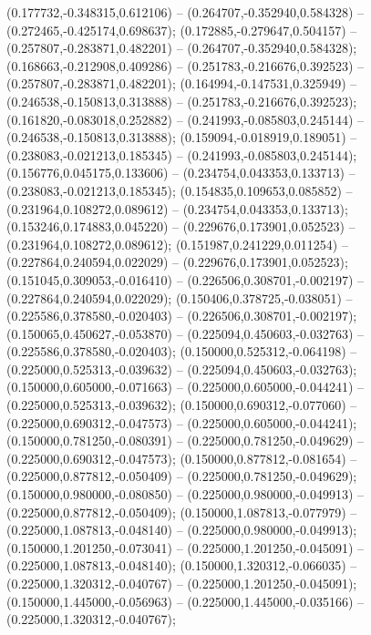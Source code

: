  (0.177732,-0.348315,0.612106) -- (0.264707,-0.352940,0.584328) -- (0.272465,-0.425174,0.698637);
 (0.172885,-0.279647,0.504157) -- (0.257807,-0.283871,0.482201) -- (0.264707,-0.352940,0.584328);
 (0.168663,-0.212908,0.409286) -- (0.251783,-0.216676,0.392523) -- (0.257807,-0.283871,0.482201);
 (0.164994,-0.147531,0.325949) -- (0.246538,-0.150813,0.313888) -- (0.251783,-0.216676,0.392523);
 (0.161820,-0.083018,0.252882) -- (0.241993,-0.085803,0.245144) -- (0.246538,-0.150813,0.313888);
 (0.159094,-0.018919,0.189051) -- (0.238083,-0.021213,0.185345) -- (0.241993,-0.085803,0.245144);
 (0.156776,0.045175,0.133606) -- (0.234754,0.043353,0.133713) -- (0.238083,-0.021213,0.185345);
 (0.154835,0.109653,0.085852) -- (0.231964,0.108272,0.089612) -- (0.234754,0.043353,0.133713);
 (0.153246,0.174883,0.045220) -- (0.229676,0.173901,0.052523) -- (0.231964,0.108272,0.089612);
 (0.151987,0.241229,0.011254) -- (0.227864,0.240594,0.022029) -- (0.229676,0.173901,0.052523);
 (0.151045,0.309053,-0.016410) -- (0.226506,0.308701,-0.002197) -- (0.227864,0.240594,0.022029);
 (0.150406,0.378725,-0.038051) -- (0.225586,0.378580,-0.020403) -- (0.226506,0.308701,-0.002197);
 (0.150065,0.450627,-0.053870) -- (0.225094,0.450603,-0.032763) -- (0.225586,0.378580,-0.020403);
 (0.150000,0.525312,-0.064198) -- (0.225000,0.525313,-0.039632) -- (0.225094,0.450603,-0.032763);
 (0.150000,0.605000,-0.071663) -- (0.225000,0.605000,-0.044241) -- (0.225000,0.525313,-0.039632);
 (0.150000,0.690312,-0.077060) -- (0.225000,0.690312,-0.047573) -- (0.225000,0.605000,-0.044241);
 (0.150000,0.781250,-0.080391) -- (0.225000,0.781250,-0.049629) -- (0.225000,0.690312,-0.047573);
 (0.150000,0.877812,-0.081654) -- (0.225000,0.877812,-0.050409) -- (0.225000,0.781250,-0.049629);
 (0.150000,0.980000,-0.080850) -- (0.225000,0.980000,-0.049913) -- (0.225000,0.877812,-0.050409);
 (0.150000,1.087813,-0.077979) -- (0.225000,1.087813,-0.048140) -- (0.225000,0.980000,-0.049913);
 (0.150000,1.201250,-0.073041) -- (0.225000,1.201250,-0.045091) -- (0.225000,1.087813,-0.048140);
 (0.150000,1.320312,-0.066035) -- (0.225000,1.320312,-0.040767) -- (0.225000,1.201250,-0.045091);
 (0.150000,1.445000,-0.056963) -- (0.225000,1.445000,-0.035166) -- (0.225000,1.320312,-0.040767);
